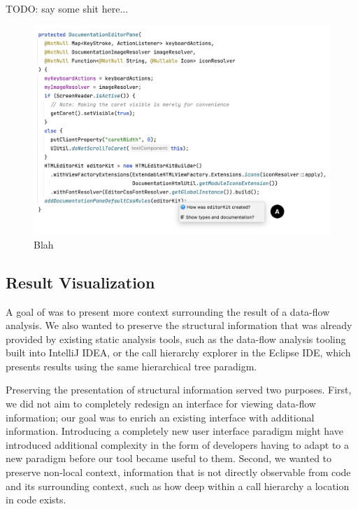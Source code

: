 TODO: say some shit here...

\begin{figure}[ht]
\centering
\includegraphics[width=\textwidth]{./figs/reach-hover-invoke.png}
\caption{
  Blah
}
\label{fig:ReachHoverInvoke}
\end{figure}


\subsection{Result Visualization}
\label{subsection:ResultVisualization}

\noindent A goal of \toolname{} was to present more context surrounding the 
result of a data-flow analysis. 
We also wanted to preserve the structural information that was
already provided by existing static analysis tools, such as the data-flow
analysis tooling built into IntelliJ IDEA, or the call hierarchy explorer in
the Eclipse \ac{IDE}, which presents results using the same hierarchical
tree paradigm.

\par Preserving the presentation of structural information served two purposes.
First, we did not aim to completely redesign an interface for viewing data-flow
information;
our goal was to enrich an existing interface with additional information.
Introducing a completely new user interface paradigm might have introduced
additional complexity in the form of developers having to adapt to a new 
paradigm before our tool became useful to them.
Second, we wanted to preserve non-local context, \ie information that is not
directly observable from code and its surrounding context, such as how deep
within a call hierarchy a location in code exists.

